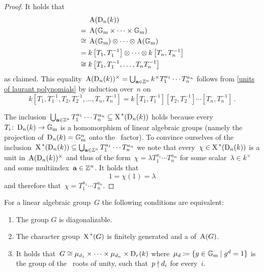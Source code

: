 \begin{proof}
  It holds that
  \begin{align*}
           &  \operatorname{A}(\operatorname{D}_n(k)) \\
        ={}&  \operatorname{A}(\mathbb{G}_{\text{m}} \times \dotsb \times \mathbb{G}_{\text{m}})  \\
    \cong{}&  \operatorname{A}(\mathbb{G}_{\text{m}}) \otimes \dotsb \otimes \operatorname{A}(\mathbb{G}_{\text{m}}) \\
        ={}&  k\left[ T_1, T_1^{-1} \right]
              \otimes \dotsb \otimes
              k\left[ T_n, T_n^{-1} \right]  \\
    \cong{}&  k\left[ T_1, T_1^{-1}, \dotsc, T_n T_n^{-1} \right]
  \end{align*}
  as claimed.
  This equality~$\operatorname{A}(\operatorname{D}_n(k))^\times = \bigcup_{\mathbf{a} \in \mathbb{Z}^n} k^\times T_1^{a_1} \dotsm T_n^{a_n}$ follows from \cref{units of laurant polynomials} by induction over~$n$ on
  \[
      k\left[ T_1, T_1^{-1}, T_2, T_2^{-1}, \dotsc, T_n, T_n^{-1} \right]
    = k\left[ T_1, T_1^{-1} \right]
       \left[ T_2, T_2^{-1} \right]
       \dotsm
       \left[ T_n, T_n^{-1} \right] \,.
  \]
  
  The inclusion~$\bigcup_{\mathbf{a} \in \mathbb{Z}^n} T_1^{a_1} \dotsm T_n^{a_n} \subseteq \operatorname{X}^{\,*}(\operatorname{D}_n(k))$ holds because every~$T_i \colon \operatorname{D}_n(k) \to \mathbb{G}_{\text{m}}$ is a homomorphism of linear algebraic groups (namely the projection of~$\operatorname{D}_n(k) = \mathbb{G}_{\text{m}}^n$ onto the~ factor).
  To convince ourselves of the inclusion~$\operatorname{X}^{\,*}(\operatorname{D}_n(k)) \subseteq \bigcup_{\mathbf{a} \in \mathbb{Z}^n} T_1^{a_1} \dotsm T_n^{a_n}$ we note that every~$\chi \in \operatorname{X}^{\,*}(\operatorname{D}_n(k))$ is a unit in~$\operatorname{A}(\operatorname{D}_n(k))^\times$ and thus of the form~$\chi = \lambda T_1^{a_1} \dotsm T_n^{a_m}$ for some scalar~$\lambda \in k^\times$ and some multiindex~$\mathbf{a} \in \mathbb{Z}^n$.
  It holds that
  \[
    1 = \chi(1) = \lambda
  \]
  and therefore that~$\chi = T_1^{a_1} \dotsm T_n^{a_n}$.
\end{proof}


\begin{theorem}
  For a linear algebraic group~$G$ the following conditions are equivalent:
  \begin{enumerate}
    \item
      \label{G is diagonalizable}
      The group $G$ is diagonalizable.
    \item
      \label{X(G) is nice}
      The character group~$\operatorname{X}^{\,*}(G)$ is finitely generated and a  of~$\operatorname{A}(G)$.
    \item
      \label{G is product of things}
      It holds that~$G \cong \mu_{d_1} \times \dotsb \times \mu_{d_n} \times \operatorname{D}_r(k)$ where~$\mu_d \defined \{g \in \Gmult \suchthat g^d = 1\}$ is the group of the~ roots of unity, such that~$p \mathrel{\nmid} d_i$ for every~$i$.
  \end{enumerate}
\end{theorem}


